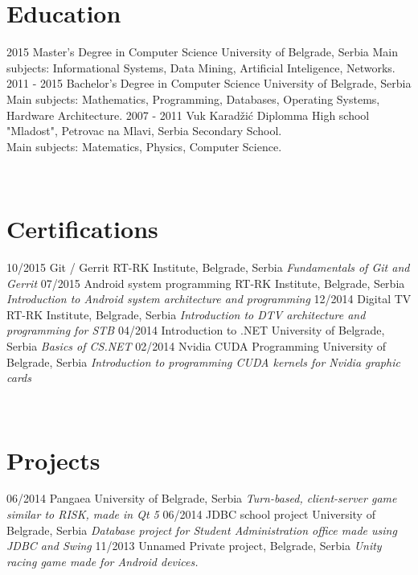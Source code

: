\documentclass[]{rankovic-cv}
\begin{document}
\section{Education}
\begin{entrylist}
  \entry
    {2015}
    {Master's Degree in Computer Science}
    {University of Belgrade, Serbia}
    {Main subjects: Informational Systems, Data Mining, Artificial Inteligence, Networks.}
  \entry
    {2011 - 2015}
    {Bachelor's Degree in Computer Science}
    {University of Belgrade, Serbia}
    {Main subjects: Mathematics, Programming, Databases, Operating Systems, Hardware Architecture.}
  \entry
    {2007 - 2011}
    {Vuk Karadžić Diplomma}
    {High school "Mladost", Petrovac na Mlavi, Serbia}
    {Secondary School.\\
    Main subjects: Matematics, Physics, Computer Science.}
\end{entrylist}
~
\section{Certifications}
\begin{entrylist}
  \entry
    {10/2015}
    {Git / Gerrit}
    {RT-RK Institute, Belgrade, Serbia}
    {\emph{Fundamentals of Git and Gerrit}}
  \entry
    {07/2015}
    {Android system programming}
    {RT-RK Institute, Belgrade, Serbia}
    {\emph{Introduction to Android system architecture and programming}}
  \entry
    {12/2014}
    {Digital TV}
    {RT-RK Institute, Belgrade, Serbia}
    {\emph{Introduction to DTV architecture and programming for STB}}
  \entry
    {04/2014}
    {Introduction to .NET }
    {University of Belgrade, Serbia}
    {\emph{Basics of CS.NET}}
  \entry
    {02/2014}
    {Nvidia CUDA Programming}
    {University of Belgrade, Serbia}
    {\emph{Introduction to programming CUDA kernels for Nvidia graphic cards}}
\end{entrylist}
~
\section{Projects}
\begin{entrylist}
  \entry
    {06/2014}
    {Pangaea}
    {University of Belgrade, Serbia}
    {\emph{Turn-based, client-server game similar to RISK, made in Qt 5}}
  \entry
    {06/2014}
    {JDBC school project}
    {University of Belgrade, Serbia}
    {\emph{Database project for Student Administration office made using JDBC and Swing}}
  \entry
    {11/2013}
    {Unnamed}
    {Private project, Belgrade, Serbia}
    {\emph{Unity racing game made for Android devices.}}  
\end{entrylist}
~
\end{document}
